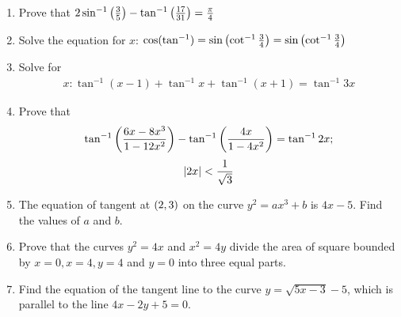 \begin{enumerate}
	\item Prove that $ 2\sin^{-1} \left(\frac{3}{5}\right) - \tan^{-1} \left(\frac{17}{31}\right) = \frac{\pi}{4}$

	\item Solve the equation for $x$: $\cos (\tan^{-1}) = \sin \left(\cot^{-1} \frac{3}{4}\right) = \sin \left(\cot^{-1} \frac{3}{4}\right)$

	
	\item Solve for 
	\begin{align*}
		x: \tan^{-1}(x-1) + \tan^{-1}x + \tan^{-1}(x+1) = \tan^{-1}3x
	\end{align*}

	\item Prove that 
	\begin{align*}
	\tan^{-1} \left(\frac{6x-8x^{3}}{1-12x^{2}}\right) - \tan^{-1} \left(\frac{4x}{1-4x^{2}}\right) = \tan^{-1}2x;
	\end{align*}
	\begin{align*}
		\left\vert2x\right\vert < \frac{1}{\sqrt{3}}
	\end{align*}

	\item The equation of tangent at $\left(2,3\right)$ on the curve $y^2 = ax^3 + b$ is $4x -5$. Find the values of $a$ and $b$.
	\item Prove that the curves $y^2 = 4x$ and $x^2 = 4y$ divide the area of square bounded by $x=0, x=4, y=4$ and $y=0$ into three equal parts.
	\item Find the equation of the tangent line to the curve $y = \sqrt{5x - 3} - 5$, which is parallel to the line $4x - 2y + 5 = 0$.	
\end{enumerate}
